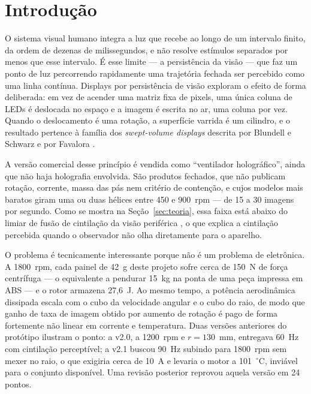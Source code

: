 \documentclass[10pt,a4paper,twocolumn]{article}
\begin{document}
\section{Introdução}

O sistema visual humano integra a luz que recebe ao longo de um intervalo
finito, da ordem de dezenas de milissegundos, e não resolve estímulos separados
por menos que esse intervalo. É esse limite --- a persistência da visão --- que
faz um ponto de luz percorrendo rapidamente uma trajetória fechada ser
percebido como uma linha contínua. Displays por persistência de visão exploram
o efeito de forma deliberada: em vez de acender uma matriz fixa de pixels, uma
única coluna de LEDs é deslocada no espaço e a imagem é escrita no ar, uma
coluna por vez. Quando o deslocamento é uma rotação, a superfície varrida é um
cilindro, e o resultado pertence à família dos \emph{swept-volume displays}
descrita por Blundell e Schwarz \cite{blundell2000} e por
Favalora \cite{favalora2005}.

A versão comercial desse princípio é vendida como ``ventilador holográfico'',
ainda que não haja holografia envolvida. São produtos fechados, que não
publicam rotação, corrente, massa das pás nem critério de contenção, e cujos
modelos mais baratos giram uma ou duas hélices entre 450 e 900~rpm --- de 15 a
30 imagens por segundo. Como se mostra na Seção~\ref{sec:teoria}, essa faixa
está abaixo do limiar de fusão de cintilação da visão periférica
\cite{tyler1985,kelly1961}, o que explica a cintilação percebida quando o
observador não olha diretamente para o aparelho.

O problema é tecnicamente interessante porque não é um problema de eletrônica.
A 1800~rpm, cada painel de 42~g deste projeto sofre cerca de 150~N de força
centrífuga --- o equivalente a pendurar 15~kg na ponta de uma peça impressa em
ABS --- e o rotor armazena 27,6~J. Ao mesmo tempo, a potência aerodinâmica
dissipada escala com o cubo da velocidade angular e o cubo do raio, de modo que
ganho de taxa de imagem obtido por aumento de rotação é pago de forma
fortemente não linear em corrente e temperatura. Duas versões anteriores do
protótipo ilustram o ponto: a v2.0, a 1200~rpm e $r=130$~mm, entregava 60~Hz
com cintilação perceptível; a v2.1 buscou 90~Hz subindo para 1800~rpm sem mexer
no raio, o que exigiria cerca de 10~A e levaria o motor a 101~$^\circ$C,
inviável para o conjunto disponível. Uma revisão posterior reprovou aquela
versão em 24 pontos.
\end{document}
